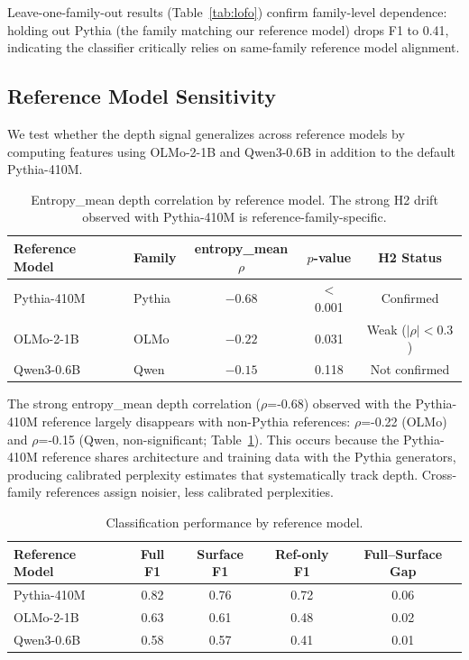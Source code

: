 \documentclass[11pt]{article}
\begin{document}
Leave-one-family-out results (Table~\ref{tab:lofo}) confirm family-level dependence: holding out Pythia (the family matching our reference model) drops F1 to 0.41, indicating the classifier critically relies on same-family reference model alignment.

\subsection{Reference Model Sensitivity}
\label{sec:ref_model}

We test whether the depth signal generalizes across reference models by computing features using OLMo-2-1B and Qwen3-0.6B in addition to the default Pythia-410M.

\begin{table}[h]
\centering
\caption{Entropy\_mean depth correlation by reference model. The strong H2 drift observed with Pythia-410M is reference-family-specific.}
\label{tab:ref_corr}
\begin{tabular}{llccc}
\toprule
Reference Model & Family & entropy\_mean $\rho$ & $p$-value & H2 Status \\
\midrule
Pythia-410M & Pythia & $-0.68$ & $<$0.001 & Confirmed \\
OLMo-2-1B & OLMo & $-0.22$ & 0.031 & Weak ($|\rho|<0.3$) \\
Qwen3-0.6B & Qwen & $-0.15$ & 0.118 & Not confirmed \\
\bottomrule
\end{tabular}
\end{table}

The strong entropy\_mean depth correlation ($\rho$=-0.68) observed with the Pythia-410M reference largely disappears with non-Pythia references: $\rho$=-0.22 (OLMo) and $\rho$=-0.15 (Qwen, non-significant; Table~\ref{tab:ref_corr}).
This occurs because the Pythia-410M reference shares architecture and training data with the Pythia generators, producing calibrated perplexity estimates that systematically track depth.
Cross-family references assign noisier, less calibrated perplexities.

\begin{table}[h]
\centering
\caption{Classification performance by reference model.}
\label{tab:ref_class}
\begin{tabular}{lcccc}
\toprule
Reference Model & Full F1 & Surface F1 & Ref-only F1 & Full--Surface Gap \\
\midrule
Pythia-410M & 0.82 & 0.76 & 0.72 & 0.06 \\
OLMo-2-1B & 0.63 & 0.61 & 0.48 & 0.02 \\
Qwen3-0.6B & 0.58 & 0.57 & 0.41 & 0.01 \\
\bottomrule
\end{tabular}
\end{table}
\end{document}
